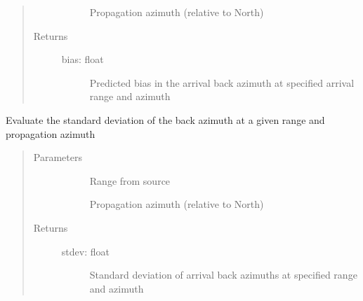 \documentclass[letterpaper,10pt,english]{sphinxmanual}
\begin{document}
\begin{fulllineitems}
\begin{fulllineitems}
\begin{quote}
\begin{description}
\begin{description}
\item[{}] \leavevmode
Propagation azimuth (relative to North)

\end{description}

\item[{Returns}] \leavevmode\begin{description}
\item[{bias: float}] \leavevmode
Predicted bias in the arrival back azimuth at specified arrival range and azimuth

\end{description}

\end{description}\end{quote}

\end{fulllineitems}


\begin{fulllineitems}
\label{\detokenize{stochprop.propagation:stochprop.propagation.PathGeometryModel.eval_az_dev_std}}
Evaluate the standard deviation of the back azimuth at a given range
and propagation azimuth
\begin{quote}\begin{description}
\item[{Parameters}] \leavevmode\begin{description}
\item[{}] \leavevmode
Range from source

\item[{}] \leavevmode
Propagation azimuth (relative to North)

\end{description}

\item[{Returns}] \leavevmode\begin{description}
\item[{stdev: float}] \leavevmode
Standard deviation of arrival back azimuths at specified range and azimuth

\end{description}


\end{description}
\end{quote}
\end{fulllineitems}
\end{fulllineitems}
\end{document}
